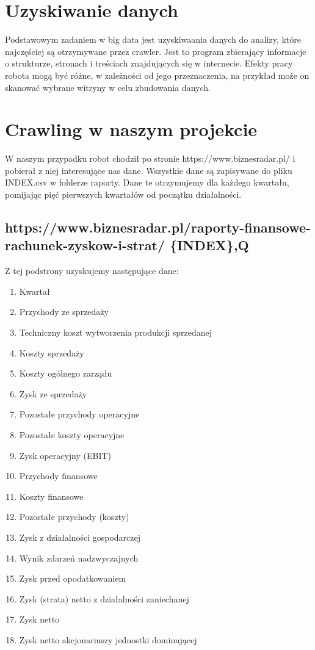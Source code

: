 \section{Uzyskiwanie danych}

Podstawowym zadaniem w big data jest uzyskiwaania danych do analizy, które najczęściej są otrzymywane przez crawler. Jest to program zbierający informacje o strukturze, stronach i treściach znajdujących się w internecie. Efekty pracy robota mogą być różne, w zależności od jego przeznaczenia, na przykład może on skanować wybrane witryny w celu zbudowania danych.

\section{Crawling w naszym projekcie}

W naszym przypadku robot chodził po stronie https://www.biznesradar.pl/ i pobierał z niej interesujące nas dane.
Wszystkie dane są zapisywane do pliku {INDEX}.csv w folderze raporty. Dane te otrzymujemy dla każdego kwartału, pomijając pięć pierwszych kwartałów od początku działalności.

\subsection{https://www.biznesradar.pl/raporty-finansowe-rachunek-zyskow-i-strat/ \{INDEX\},Q}
Z tej podstrony uzyskujemy następujące dane:
\begin{enumerate}
  \item Kwartał
  \item Przychody ze sprzedaży
  \item Techniczny koszt wytworzenia produkcji sprzedanej
  \item Koszty sprzedaży
  \item Koszty ogólnego zarządu
  \item Zysk ze sprzedaży
  \item Pozostałe przychody operacyjne
  \item Pozostałe koszty operacyjne
  \item Zysk operacyjny (EBIT)
  \item Przychody finansowe
  \item Koszty finansowe
  \item Pozostałe przychody (koszty)
  \item Zysk z działalności gospodarczej
  \item Wynik zdarzeń nadzwyczajnych
  \item Zysk przed opodatkowaniem
  \item Zysk (strata) netto z działalności zaniechanej
  \item Zysk netto
  \item Zysk netto akcjonariuszy jednostki dominującej
\end{enumerate}

